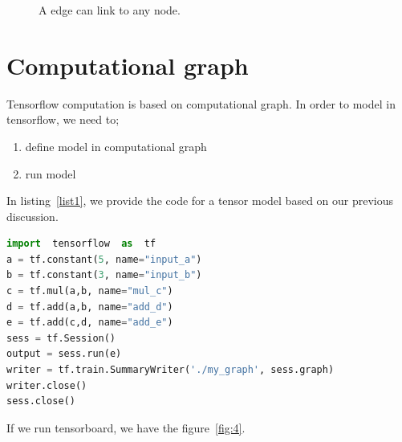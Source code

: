 \documentclass[vecarrow]{svproc}
\begin{document}
\begin{figure} 
\caption{A edge can link to any node.}
\label{fig:3} 
\end{figure} 


\section{Computational graph}

Tensorflow computation is based on computational graph. In order to model in tensorflow, we need to;
\begin{enumerate}
\item define model in computational graph
\item run model
\end{enumerate}

In listing~\ref{list1}, we provide the code for a tensor model based on our previous discussion.

\renewcommand{\thelstlisting}{\arabic{lstlisting}}

\begin{lstlisting}[language=Python, 
caption={an example of tensorflow model},label={list1}]
import	tensorflow	as	tf
a =	tf.constant(5, name="input_a")
b =	tf.constant(3, name="input_b")
c =	tf.mul(a,b, name="mul_c")
d =	tf.add(a,b, name="add_d")
e = tf.add(c,d, name="add_e")
sess = tf.Session()
output = sess.run(e)
writer = tf.train.SummaryWriter('./my_graph', sess.graph)
writer.close()
sess.close()
\end{lstlisting}

If we run tensorboard, we have the figure~\ref{fig:4}.
\end{document}
